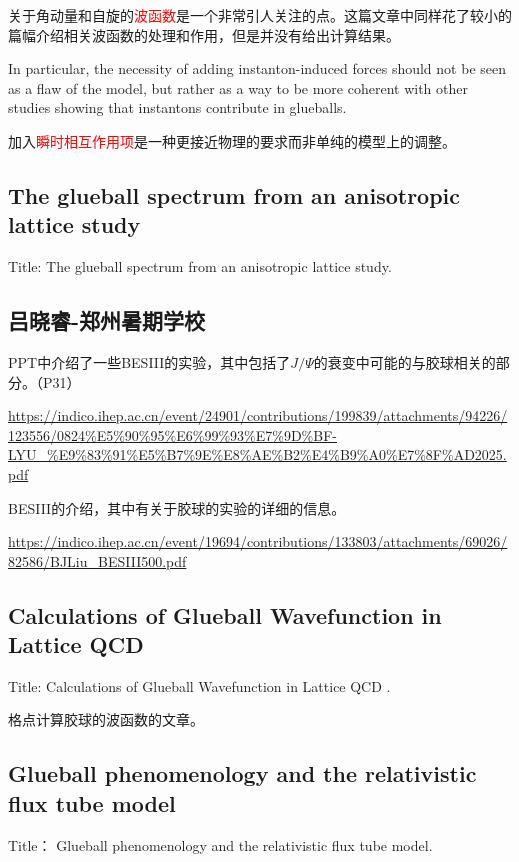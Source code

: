 \documentclass{article}
\begin{document}
关于角动量和自旋的\textcolor{red}{波函数}是一个非常引人关注的点。这篇文章中同样花了较小的篇幅介绍相关波函数的处理和作用，但是并没有给出计算结果。

In particular, the necessity of adding
instanton-induced forces should not be seen as a flaw of the model, but rather as a way to be more coherent with
other studies showing that instantons contribute in glueballs.

加入\textcolor{red}{瞬时相互作用项}是一种更接近物理的要求而非单纯的模型上的调整。



\subsection{The glueball spectrum from an anisotropic lattice study}
Title: The glueball spectrum from an anisotropic lattice study. \cite{Morningstar:1999rf}



\subsection{吕晓睿-郑州暑期学校}

PPT中介绍了一些BESIII的实验，其中包括了$J/ \Psi$的衰变中可能的与胶球相关的部分。（P31）

\url{https://indico.ihep.ac.cn/event/24901/contributions/199839/attachments/94226/123556/0824%E5%90%95%E6%99%93%E7%9D%BF-LYU_%E9%83%91%E5%B7%9E%E8%AE%B2%E4%B9%A0%E7%8F%AD2025.pdf}

BESIII的介绍，其中有关于胶球的实验的详细的信息。

\url{https://indico.ihep.ac.cn/event/19694/contributions/133803/attachments/69026/82586/BJLiu_BESIII500.pdf}

\subsection{Calculations of Glueball Wavefunction in Lattice QCD}

Title: Calculations of Glueball Wavefunction in Lattice QCD \cite{doi:10.1142/S0217732307023183}.

格点计算胶球的波函数的文章。


\subsection{Glueball phenomenology and the relativistic flux tube model}

Title： Glueball phenomenology and the relativistic flux tube model\cite{PhysRevD.80.074021}.
\end{document}
